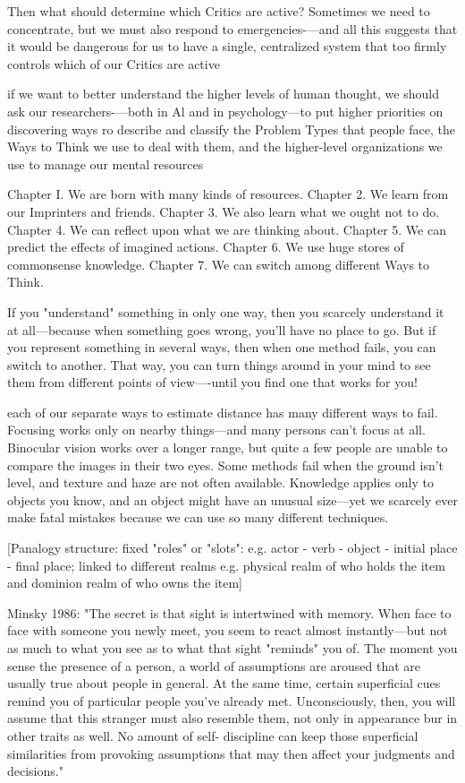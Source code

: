 \documentclass[10pt,a4paper]{article}
\begin{document}
Then what should determine which Critics are active? Sometimes we need to concentrate, but we must also respond to emergencies-—and all this suggests that it would be dangerous for us to have a single, centralized system that too firmly controls which of our Critics are active \cite[p.~250]{minsky}

if we want to better understand the higher levels of human thought, we should ask our researchers-—both in Al and in psychology—to put higher priorities on discovering ways ro describe and classify the Problem Types that people face, the Ways to Think we use to deal with them, and the higher-level organizations we use to manage our mental resources \cite[p.~252-253]{minsky}

Chapter I. We are born with many kinds of resources.
Chapter 2. We learn from our Imprinters and friends.
Chapter 3. We also learn what we ought not to do.
Chapter 4. We can reflect upon what we are thinking about.
Chapter 5. We can predict the effects of imagined actions.
Chapter 6. We use huge stores of commonsense knowledge.
Chapter 7. We can switch among different Ways to Think.
\cite[p.~256]{minsky}

If you "understand" something in only one way, then you scarcely understand it at all—because when something goes wrong, you'll have no place to go. But if you represent something in several ways, then when one method fails, you can switch to another. That way, you can turn things around in your mind to see them from different points of view—-until you find one that works for you! \cite[p.~257]{minsky}

each of our separate ways to estimate distance has many different ways to fail. Focusing works only on nearby things—and many persons can't focus at all. Binocular vision works over a longer range, but quite a few people are unable to compare the images in their two eyes. Some methods fail when the ground isn't level, and texture and haze are not often available. Knowledge applies only to objects you know, and an object might have an unusual size—yet we scarcely ever make fatal mistakes because we can use so many different techniques. \cite[p.~259-260]{minsky}

[Panalogy structure: fixed "roles" or "slots": e.g. actor - verb - object - initial place - final place; linked to different realms e.g. physical realm of who holds the item and dominion realm of who owns the item] \cite[p.~261]{minsky}

Minsky 1986: "The secret is that sight is intertwined with memory. When face to face with someone you newly meet, you seem to react almost instantly—but not as much to what you see as to what that sight "reminds" you of. The moment you sense the presence of a person, a world of assumptions are aroused that are usually true about people in general. At the same time, certain superficial cues remind you of particular people you've already met. Unconsciously, then, you will assume that this stranger must also resemble them, not only in appearance bur in other traits as well. No amount of self- discipline can keep those superficial similarities from provoking assumptions that may then affect your judgments and decisions." \cite[p.~263]{minsky}
\end{document}
